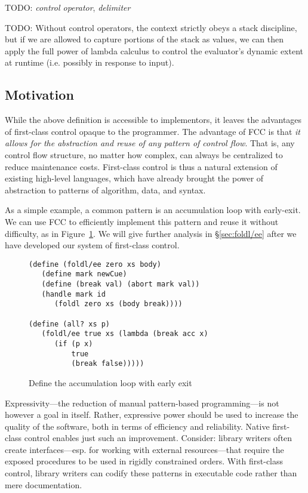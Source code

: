 \documentclass[11pt]{article}
\begin{document}
TODO:
\emph{control operator},
\emph{delimiter}

TODO:
Without control operators, the context strictly obeys a stack discipline, but if we are allowed to capture portions of the stack as values, we can then apply the full power of lambda calculus to control the evaluator's dynamic extent at runtime (i.e. possibly in response to input).

\subsection{Motivation}

While the above definition is accessible to implementors, it leaves the advantages of first-class control opaque to the programmer.
The advantage of FCC is that \emph{it allows for the abstraction and reuse of any pattern of control flow}.
That is, any control flow structure, no matter how complex, can always be centralized to reduce maintenance costs.
First-class control is thus a natural extension of existing high-level languages, which have already brought the power of abstraction to patterns of algorithm, data, and syntax.

As a simple example, a common pattern is an accumulation loop with early-exit.
We can use FCC to efficiently implement this pattern and reuse it without difficulty, as in Figure~\ref{fig:ex-foldl/ee}.
We will give further analysis in \S\ref{sec:foldl/ee} after we have developed our system of first-class control.

\begin{figure}
\caption{Define the accumulation loop with early exit}
\label{fig:ex-foldl/ee}
\begin{verbatim}
(define (foldl/ee zero xs body)
   (define mark newCue)
   (define (break val) (abort mark val))
   (handle mark id
      (foldl zero xs (body break))))

(define (all? xs p)
   (foldl/ee true xs (lambda (break acc x)
      (if (p x)
          true
          (break false)))))
\end{verbatim}
\end{figure}

Expressivity---the reduction of manual pattern-based programming---is not however a goal in itself.
Rather, expressive power should be used to increase the quality of the software, both in terms of efficiency and reliability.
Native first-class control enables just such an improvement.
Consider: library writers often create interfaces---esp. for working with external resources---that require the exposed procedures to be used in rigidly constrained orders.
With first-class control, library writers can codify these patterns in executable code rather than mere documentation.
\end{document}
